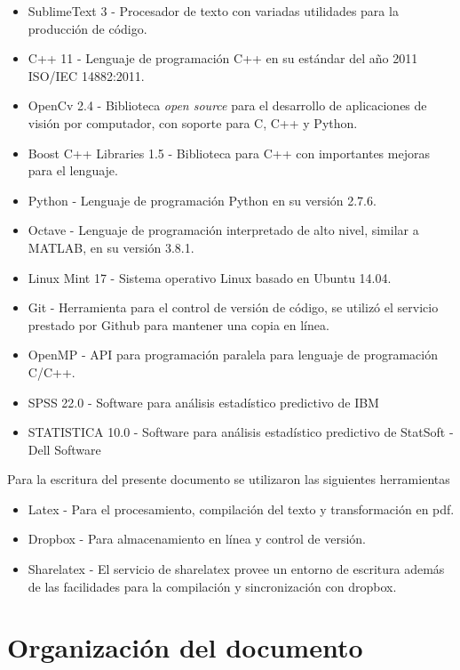 \begin{itemize}
  \item SublimeText 3 - Procesador de texto con variadas utilidades para la producción de código.
  \item C++ 11 - Lenguaje de programación C++ en su estándar del año 2011 ISO/IEC 14882:2011.
  \item OpenCv 2.4 - Biblioteca \textit{open source} para el desarrollo de aplicaciones de visión por computador, con soporte para C, C++ y Python.
  \item Boost C++ Libraries 1.5 - Biblioteca para C++ con importantes mejoras para el lenguaje.
  \item Python - Lenguaje de programación Python en su versión 2.7.6.
  \item Octave - Lenguaje de programación interpretado de alto nivel, similar a MATLAB, en su versión 3.8.1.
  \item Linux Mint 17 - Sistema operativo Linux basado en Ubuntu 14.04.
  \item Git - Herramienta para el control de versión de código, se utilizó el servicio prestado por Github para mantener una copia en línea.
  \item OpenMP - API para programación paralela para lenguaje de programación C/C++.
  \item SPSS 22.0 - Software para análisis estadístico predictivo de IBM 
  \item STATISTICA 10.0 - Software para análisis estadístico predictivo de StatSoft - Dell Software
\end{itemize}

Para la escritura del presente documento se utilizaron las siguientes herramientas

\begin{itemize}
\item Latex - Para el procesamiento, compilación del texto y transformación en pdf.
\item Dropbox - Para almacenamiento en línea y control de versión.
\item Sharelatex - El servicio de sharelatex provee un entorno de escritura además de las facilidades para la compilación y sincronización con dropbox.
\end{itemize}


\section{Organizaci\'on del documento}
\label{intro:organizacion}

